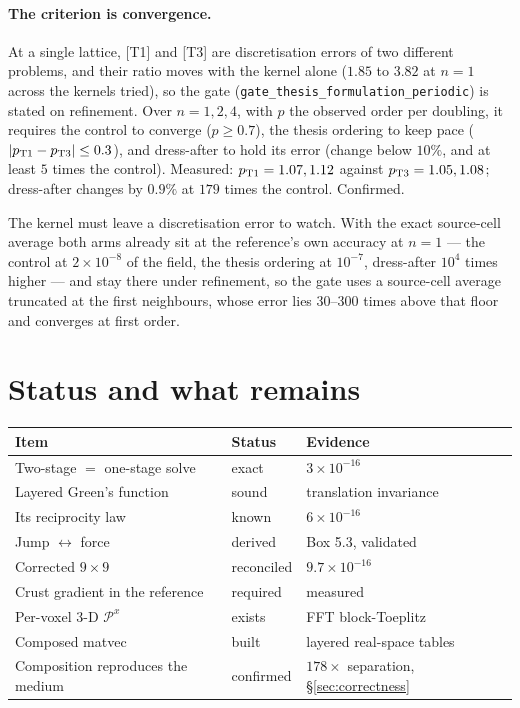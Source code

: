 \documentclass[11pt,a4paper]{article}
\newcommand{\Px}{\mathcal{P}^{x}}
\begin{document}
\paragraph{The criterion is convergence.} At a single lattice, [T1] and [T3] are discretisation
errors of two different problems, and their ratio moves with the kernel alone ($1.85$ to $3.82$ at
$n = 1$ across the kernels tried), so the gate (\texttt{gate\_thesis\_formulation\_periodic}) is
stated on refinement. Over $n = 1, 2, 4$, with $p$ the observed order per doubling, it requires the
control to converge ($p \ge 0.7$), the thesis ordering to keep pace ($|p_{\rm T1} - p_{\rm T3}| \le
0.3$), and dress-after to hold its error (change below $10\%$, and at least $5$ times the control).
Measured: $p_{\rm T1} = 1.07, 1.12$ against $p_{\rm T3} = 1.05, 1.08$; dress-after changes by $0.9\%$
at $179$ times the control. Confirmed.

The kernel must leave a discretisation error to watch. With the exact source-cell average both arms
already sit at the reference's own accuracy at $n=1$ --- the control at $2\times10^{-8}$ of the
field, the thesis ordering at $10^{-7}$, dress-after $10^{4}$ times higher --- and stay there under
refinement, so the gate uses a source-cell average truncated at the first neighbours, whose error
lies $30$--$300$ times above that floor and converges at first order.

\section{Status and what remains}

\begin{center}
\begin{tabular}{lll}
\toprule
Item & Status & Evidence \\
\midrule
Two-stage $=$ one-stage solve      & exact      & $3\times10^{-16}$ \\
Layered Green's function           & sound      & translation invariance \\
Its reciprocity law                & known      & $6\times10^{-16}$ \\
Jump $\leftrightarrow$ force       & derived    & Box 5.3, validated \\
Corrected $9\times9$               & reconciled & $9.7\times10^{-16}$ \\
Crust gradient in the reference    & required   & measured \\
Per-voxel 3-D $\Px$                & exists     & FFT block-Toeplitz \\
\midrule
Composed matvec                    & built      & layered real-space tables \\
Composition reproduces the medium  & confirmed  & $178\times$ separation, \S\ref{sec:correctness} \\
\bottomrule
\end{tabular}
\end{center}
\end{document}
